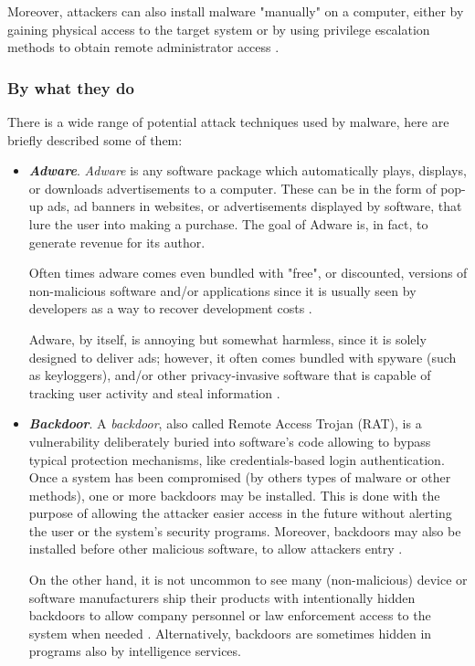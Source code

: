 \documentclass[pdfa%
,cucitura%
]{toptesi}
\begin{document}
Moreover, attackers can also install malware "manually" on a computer, either by gaining physical access to the target system or by using privilege escalation methods to obtain remote administrator access \cite{FruhlingerME}.

\subsubsection{By what they do}
There is a wide range of potential attack techniques used by malware, here are briefly described some of them:

\begin{itemize}
	\item \textbf{\textit{Adware}}. \textit{Adware} is any software package which automatically plays, displays, or downloads advertisements to a computer. These can be in the form of pop-up ads, ad banners in websites, or advertisements displayed by software, that lure the user into making a purchase. The goal of Adware is, in fact, to generate revenue for its author.
	
	Often times adware comes even bundled with "free", or discounted, versions of non-malicious software and/or applications since it is usually seen by developers as a way to recover development costs \cite{MullinsMT}.
	
	Adware, by itself, is annoying but somewhat harmless, since it is solely designed to deliver ads; however, it often comes bundled with spyware (such as keyloggers), and/or other privacy-invasive software that is capable of tracking user activity and steal information \cite{DuPaulCMT}.
	
	\item \textbf{\textit{Backdoor}}. A \textit{backdoor}, also called Remote Access Trojan (RAT), is a vulnerability deliberately buried into software's code allowing to bypass typical protection mechanisms, like credentials-based login authentication. Once a system has been compromised (by others types of malware or other methods), one or more backdoors may be installed. This is done with the purpose of allowing the attacker easier access in the future without alerting the user or the system's security programs. Moreover, backdoors may also be installed before other malicious software, to allow attackers entry \cite{MullinsMT}.
	
	On the other hand, it is not uncommon to see many (non-malicious) device or software manufacturers ship their products with intentionally hidden backdoors to allow company personnel or law enforcement access to the system when needed \cite{IngallsTOM}. Alternatively, backdoors are sometimes hidden in programs also by intelligence services.
	

\end{itemize}
\end{document}
